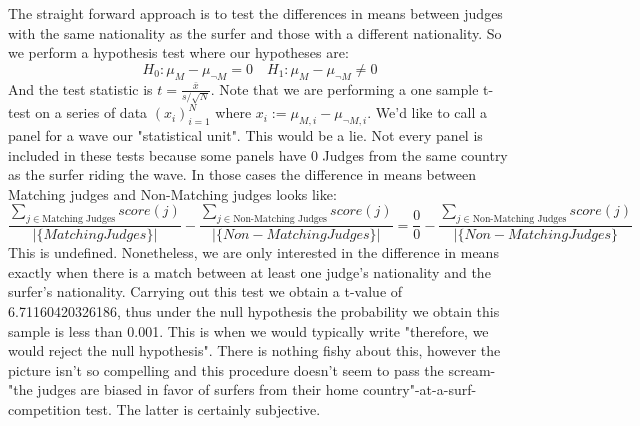 \documentclass{article}
\begin{document}
The straight forward approach is to test the differences in means between judges with the same nationality as the surfer and those with a different nationality. So we perform a hypothesis test where our hypotheses are:
\[ H_0: \mu_M  - \mu_{\neg M} = 0  \quad H_1: \mu_M -\mu_{\neg M} \neq 0 \]
And the test statistic is $ t = \frac{\bar{x}}{s/\sqrt{N}} $. Note that we are performing a one sample t-test on a series of data $(x_i)_{i=1}^N$ where $x_i := \mu_{M,i}  - \mu_{\neg M,i}$.  We'd like to call a panel for a wave our "statistical unit". This would be a lie. Not every panel is included in these tests because some panels have 0 Judges from the same country as the surfer riding the wave. In those cases the difference in means between Matching judges and Non-Matching judges looks like:
\[\frac{\sum_{j \in \text{Matching Judges}} score(j) }{|\{Matching Judges\}|} - \frac{\sum_{j \in\text{Non-Matching Judges}} score(j) }{|\{Non-Matching Judges\}|} = \frac{0}{0} - \frac{\sum_{j \in\text{Non-Matching Judges}} score(j) }{|\{Non-Matching Judges\}} \]
This is undefined. Nonetheless, we are only interested in the difference in means exactly when there is a match between at least one judge's nationality and the surfer's nationality. Carrying out this test we obtain a t-value of 6.71160420326186, thus under the null hypothesis the probability we obtain this sample is less than 0.001. This is when we would typically write "therefore, we would reject the null hypothesis". There is nothing fishy about this, however the picture isn't so compelling and this procedure doesn't seem to pass the scream-"the judges are biased in favor of surfers from their home country"-at-a-surf-competition test. The latter is certainly subjective. 
\end{document}
